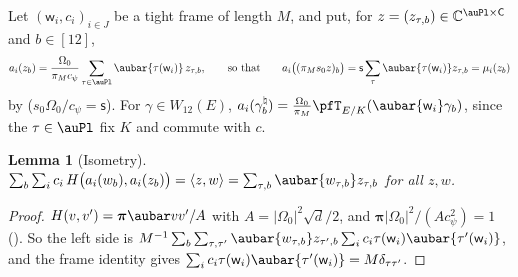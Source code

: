 \documentclass[10pt]{amsart}
\newtheorem{lemma}[theorem]{Lemma}
\theoremstyle{definition}
\theoremstyle{remark}
\newcommand{\C}{\mathbb C}
\begin{document}
Let $(\mathsf w_i,c_i)_{i\in J}$ be a tight frame of length $M$, and put, for $z=(z_{\tau,b})\in
\C^{\auPl\times\mathsf C}$ and $b\in[12]$,
\[
a_{i}(z_b)=\frac{\Omega_0}{\pi_Mc_\psi}\sum_{\tau\in\auPl}\aubar{\tau(\mathsf w_i)}\,z_{\tau,b} ,
\qquad\text{so that}\qquad a_i\bigl((\pi_Ms_0z)_b\bigr)=\mathsf s\sum_\tau\aubar{\tau(\mathsf w_i)}
z_{\tau,b}=\mu_i(z_b)
\]
by {\cite[(45)]{P49}} ($s_0\Omega_0/c_\psi=\mathsf s$). For $\gamma\in W_{12}(E)$,
$a_i(\gamma^\natural_b)=\frac{\Omega_0}{\pi_M}\pfT_{E/K}(\aubar{\mathsf w_i}\gamma_b)$, since the
$\tau\in\auPl$ fix $K$ and commute with $c$.

\begin{lemma}[Isometry]\label{pst:iso}
$\sum_{b}\sum_ic_i\,H\bigl(a_i(w_b),a_i(z_b)\bigr)=\langle z,w\rangle=\sum_{\tau,b}\aubar{w_{\tau,b}}
z_{\tau,b}$ for all $z,w$.
\end{lemma}
\begin{proof}
$H(v,v')=\boldsymbol\pi\aubar vv'/A$ with $A=|\Omega_0|^2\sqrt d/2$, and $\boldsymbol\pi|\Omega_0|^2
/(Ac_\psi^2)=1$ ({\cite[\S5.2.8]{P49}}). So the left side is $M^{-1}\sum_b\sum_{\tau,\tau'}\aubar{w_{
\tau,b}}z_{\tau',b}\sum_ic_i\tau(\mathsf w_i)\aubar{\tau'(\mathsf w_i)}$, and the frame identity gives
$\sum_ic_i\tau(\mathsf w_i)\aubar{\tau'(\mathsf w_i)}=M\delta_{\tau\tau'}$.
\end{proof}
\end{document}
